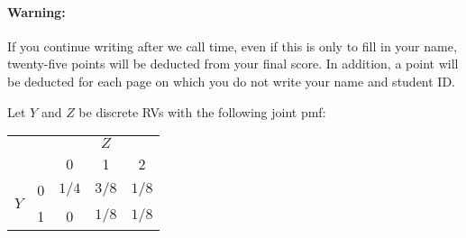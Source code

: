 \documentclass[addpoints,12pt]{exam}
\begin{document}
\paragraph{Warning:} If you continue writing after we call time, even if this is only to fill in your name, twenty-five points will be deducted from your final score. In addition, a point will be deducted for each page on which you do not write your name and student ID. 

\newpage

\begin{questions}

  \question Let $Y$ and $Z$ be discrete RVs with the following joint pmf:
			\begin{center}
\begin{tabular}{|cc|ccc|}
\hline
&&\multicolumn{3}{c|}{$Z$}\\
&&0 & 1 & 2\\
\hline
\multirow{2}{*}{$Y$}
&0& \multicolumn{0}{|c}{$1/4$} & $3/8$ & $1/8$ \\
&1& \multicolumn{1}{|c}{0} & $1/8$ & $1/8$\\
\hline
\end{tabular}
\end{center}
\end{questions}
\end{document}
